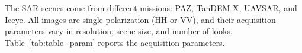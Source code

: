 \documentclass[
  lettersize  journal,
]{IEEEtran}%
\providecommand{\DIFaddbeginFL}{} %
\providecommand{\DIFdelbeginFL}{} %
\providecommand{\DIFdelendFL}{} %
\providecommand{\DIFscaledelfig}{0.5}
\newlength{\DIFdelgraphicswidth} %
\newlength{\DIFdelgraphicsheight} %
\providecommand{\DIFaddincludegraphics}[2][]{{\color{blue}\fbox{\DIFOincludegraphics[#1]{#2}}}} %
\providecommand{\DIFdelincludegraphics}[2][]{%
\sbox{\DIFdelgraphicsbox}{\DIFOincludegraphics[#1]{#2}}%
\settoboxwidth{\DIFdelgraphicswidth}{\DIFdelgraphicsbox} %
\settoboxtotalheight{\DIFdelgraphicsheight}{\DIFdelgraphicsbox} %
\scalebox{\DIFscaledelfig}{%
\parbox[b]{\DIFdelgraphicswidth}{\usebox{\DIFdelgraphicsbox}\\[-\baselineskip] \rule{\DIFdelgraphicswidth}{0em}}\llap{\resizebox{\DIFdelgraphicswidth}{\DIFdelgraphicsheight}{%
\setlength{\unitlength}{\DIFdelgraphicswidth}%
\begin{picture}(1,1)%
\thicklines\linethickness{2pt} %
{\color[rgb]{1,0,0}\put(0,0){\framebox(1,1){}}}%
{\color[rgb]{1,0,0}\put(0,0){\line( 1,1){1}}}%
{\color[rgb]{1,0,0}\put(0,1){\line(1,-1){1}}}%
\end{picture}%
}\hspace*{3pt}}} %
} %
\DeclareRobustCommand{\DIFaddbeginFL}{\DIFOaddbeginFL \let\includegraphics\DIFaddincludegraphics} %
\DeclareRobustCommand{\DIFdelbeginFL}{\DIFOdelbeginFL \let\includegraphics\DIFdelincludegraphics} %
\DeclareRobustCommand{\DIFdelendFL}{\DIFOaddendFL \let\includegraphics\DIFOincludegraphics} %
\begin{document}
The SAR scenes come from different missions: PAZ, TanDEM-X, UAVSAR, and
Iceye. All images are single-polarization (HH or VV), and their
acquisition parameters vary in resolution, scene size, and number of
looks. Table~\ref{tab:table_param} reports the acquisition parameters.

\renewcommand{\arraystretch}{2.5}

\begin{table}[hbt]
\centering
\DIFdelbeginFL %
\DIFdelendFL \caption{\label{tab:table_param}Parameters of selected SAR images.}
\centering
\DIFdelbeginFL %
\DIFdelendFL \DIFaddbeginFL {}
\end{table}
\end{document}
